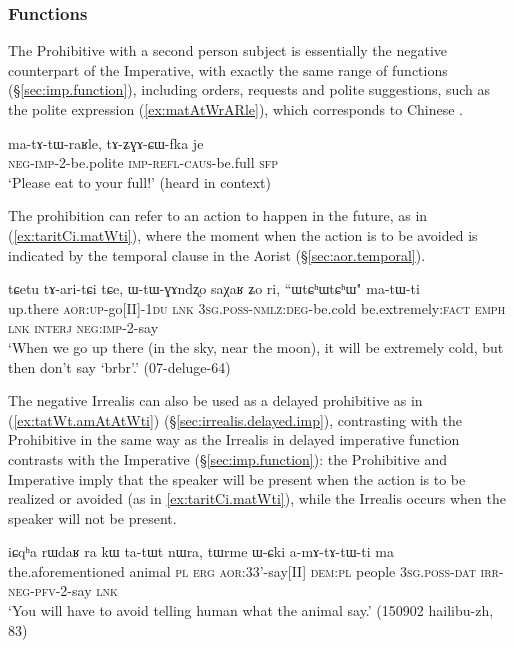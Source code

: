 \subsubsection{Functions} \label{sec:prohib.function}
The Prohibitive with a second person subject is essentially the negative counterpart of the Imperative, with exactly the same range of functions (§\ref{sec:imp.function}), including orders,  requests and polite suggestions, such as the polite expression  (\ref{ex:matAtWrARle}), which corresponds to Chinese .

\begin{exe}
\ex  \label{ex:matAtWrARle}
\gll ma-tɤ-tɯ-raʁle, tɤ-ʑɣɤ-ɕɯ-fka je\\
\textsc{neg}-\textsc{imp}-2-be.polite \textsc{imp}-\textsc{refl}-\textsc{caus}-be.full \textsc{sfp} \\
\glt `Please eat to your full!' (heard in context)
\end{exe}

The prohibition can refer to an action to happen in the future, as in (\ref{ex:taritCi.matWti}), where the moment when the action is to be avoided is indicated by the temporal clause in the Aorist (§\ref{sec:aor.temporal}).

\begin{exe}
\ex  \label{ex:taritCi.matWti}
\gll tɕetu tɤ-ari-tɕi tɕe, ɯ-tɯ-ɣɤndʐo saχaʁ ʑo ri, ``ɯtɕʰɯtɕʰɯ" ma-tɯ-ti \\
up.there \textsc{aor}:\textsc{up}-go[II]-\textsc{1du} \textsc{lnk} \textsc{3sg}.\textsc{poss}-\textsc{nmlz}:\textsc{deg}-be.cold be.extremely:\textsc{fact} \textsc{emph} \textsc{lnk} \textsc{interj} \textsc{neg}:\textsc{imp}-2-say \\
\glt `When we go up there (in the sky, near the moon), it will be extremely cold, but then don't say `brbr'.' (07-deluge-64)
\end{exe}

The negative Irrealis can also be used as a delayed prohibitive as in (\ref{ex:tatWt.amAtAtWti}) (§\ref{sec:irrealis.delayed.imp}), contrasting with the Prohibitive in the same way as the Irrealis in delayed imperative function contrasts with the Imperative (§\ref{sec:imp.function}): the Prohibitive and Imperative imply that the speaker will be present when the action is to be realized or avoided (as in \ref{ex:taritCi.matWti}), while the Irrealis occurs when the speaker will not be present. 

\begin{exe}
\ex  \label{ex:tatWt.amAtAtWti}
\gll iɕqʰa rɯdaʁ ra kɯ ta-tɯt nɯra, tɯrme ɯ-ɕki a-mɤ-tɤ-tɯ-ti ma \\
the.aforementioned animal \textsc{pl} \textsc{erg} \textsc{aor}:3\fl{}3'-say[II] \textsc{dem}:\textsc{pl} people \textsc{3sg}.\textsc{poss}-\textsc{dat} \textsc{irr}-\textsc{neg}-\textsc{pfv}-2-say \textsc{lnk} \\
\glt `You will have to avoid telling human what the animal say.' (150902 hailibu-zh, 83)
\end{exe}

